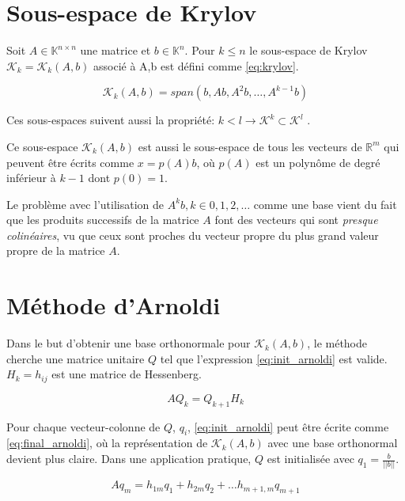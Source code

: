 \documentclass[a4paper, 15pt]{report}
\begin{document}
    \section{Sous-espace de Krylov}
    Soit $A \in \mathbb{K}^{n \times n}$ une matrice et $b\in \mathbb{K}^{n}$. Pour $k\leq n$ le sous-espace de Krylov $\mathcal{K}_{k}=\mathcal{K}_{k}(A,b)$ associé à A,b est défini comme \ref{eq:krylov}.

    \begin{equation}\label{eq:krylov}
        \mathcal{K}_{k}(A,b) = span(b,Ab,A^{2}b,\dots , A^{k-1}b)
    \end{equation}

    Ces sous-espaces suivent aussi la propriété: $k<l \to \mathcal{K}^{k} \subset \mathcal{K}^{l}$ \cite{bonnet}.

    Ce sous-espace $\mathcal{K}_{k}(A,b)$ est aussi le sous-espace de tous les vecteurs de $\mathbb{R}^{m}$ qui peuvent être écrits comme $x=p(A)b$, où $p(A)$ est un polynôme de degré inférieur à $k-1$ dont $p(0)=1$.

    Le problème avec l'utilisation de ${A^{k}b}, k \in {0,1,2,\dots}$ comme une base vient du fait que les produits successifs de la matrice $A$ font des vecteurs qui sont \textit{presque colinéaires}, vu que ceux sont proches du vecteur propre du plus grand valeur propre de la matrice $A$.

    \section{Méthode d'Arnoldi}
    
    Dans le but d'obtenir une base orthonormale pour $\mathcal{K}_{k}(A,b)$, le méthode cherche une matrice unitaire $Q$ tel que l'expression \ref{eq:init_arnoldi} est valide. $H_{k}={h_{ij}}$ est une matrice de Hessenberg.

    \begin{equation} \label{eq:init_arnoldi}
        AQ_{k} = Q_{k+1}H_{k}
    \end{equation} 

    Pour chaque vecteur-colonne de $Q$, $q_{i}$, \ref{eq:init_arnoldi} peut être écrite comme \ref{eq:final_arnoldi}, où la représentation de $\mathcal{K}_{k}(A,b)$ avec une base orthonormal devient plus claire. Dans une application pratique, $Q$ est initialisée avec $q_{1} = \frac{b}{||b||}$.

    \begin{equation}\label{eq:final_arnoldi}
        Aq_{m} = h_{1m}q_{1} + h_{2m}q_{2} + \dots h_{m+1,m}q_{m+1}
    \end{equation}
\end{document}
